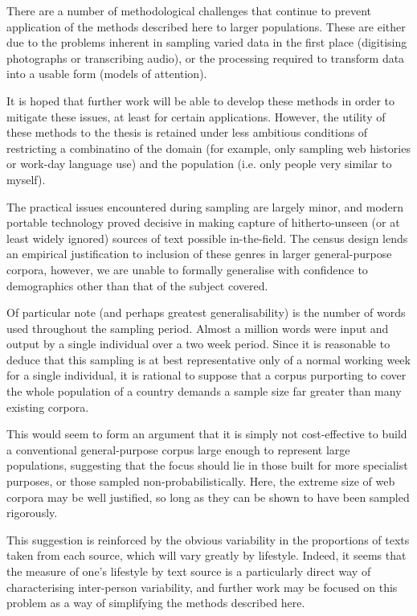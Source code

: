 
There are a number of methodological challenges that continue to prevent application of the methods described here to larger populations.  These are either due to the problems inherent in sampling varied data in the first place (digitising photographs or transcribing audio), or the processing required to transform data into a usable form (models of attention).

It is hoped that further work will be able to develop these methods in order to mitigate these issues, at least for certain applications.  However, the utility of these methods to the thesis is retained under less ambitious conditions of restricting a combinatino of the domain (for example, only sampling web histories or work-day language use) and the population (i.e. only people very similar to myself).

The practical issues encountered during sampling are largely minor, and modern portable technology proved decisive in making capture of hitherto-unseen (or at least widely ignored) sources of text possible in-the-field.  The census design lends an empirical justification to inclusion of these genres in larger general-purpose corpora, however, we are unable to formally generalise with confidence to demographics other than that of the subject covered.

Of particular note (and perhaps greatest generalisability) is the number of words used throughout the sampling period.  Almost a million words were input and output by a single individual over a two week period.  Since it is reasonable to deduce that this sampling is at best representative only of a normal working week for a single individual, it is rational to suppose that a corpus purporting to cover the whole population of a country demands a sample size far greater than many existing corpora.


This would seem to form an argument that it is simply not cost-effective to build a conventional general-purpose corpus large enough to represent large populations, suggesting that the focus should lie in those built for more specialist purposes, or those sampled non-probabilistically.  Here, the extreme size of web corpora may be well justified, so long as they can be shown to have been sampled rigorously.


This suggestion is reinforced by the obvious variability in the proportions of texts taken from each source, which will vary greatly by lifestyle.  Indeed, it seems that the measure of one's lifestyle by text source is a particularly direct way of characterising inter-person variability, and further work may be focused on this problem as a way of simplifying the methods described here.


